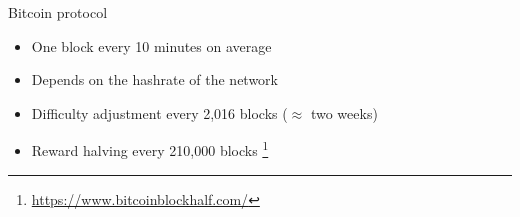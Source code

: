 \documentclass{beamer}
\newcommand\blfootnote[1]{%
  \begingroup
  \renewcommand\thefootnote{}\footnote{#1}%
  \addtocounter{footnote}{-1}%
  \endgroup
}
\begin{document}
\begin{frame}{Bitcoin protocol}
\begin{itemize}
  \item One block every 10 minutes on average
  \item Depends on the hashrate of the network
  \item Difficulty adjustment every 2,016 blocks ($\approx$ two weeks)
  \item Reward halving every 210,000 blocks\blfootnote{\url{https://www.bitcoinblockhalf.com/}}
\end{itemize}

\end{frame}
\end{document}
